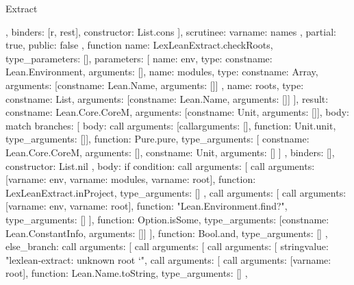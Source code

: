 \begin{lexlean}{Extract}
\begin{toolingmodule}
{{{{{{              }
            },
            binders: [r, rest],
            constructor: List.cons
          }
        ],
        scrutinee: var{name: names}
      },
      partial: true,
      public: false
    },
    function{
      name: LexLeanExtract.checkRoots,
      type_parameters: [],
      parameters: [
        {name: env, type: const{name: Lean.Environment, arguments: []}},
        {
          name: modules,
          type: const{name: Array, arguments: [const{name: Lean.Name, arguments: []}]}
        },
        {name: roots, type: const{name: List, arguments: [const{name: Lean.Name, arguments: []}]}}
      ],
      result: const{name: Lean.Core.CoreM, arguments: [const{name: Unit, arguments: []}]},
      body: match{
        branches: [
          {
            body: call{
              arguments: [call{arguments: [], function: Unit.unit, type_arguments: []}],
              function: Pure.pure,
              type_arguments: [
                const{name: Lean.Core.CoreM, arguments: []},
                const{name: Unit, arguments: []}
              ]
            },
            binders: [],
            constructor: List.nil
          },
          {
            body: if{
              condition: call{
                arguments: [
                  call{
                    arguments: [var{name: env}, var{name: modules}, var{name: root}],
                    function: LexLeanExtract.inProject,
                    type_arguments: []
                  },
                  call{
                    arguments: [
                      call{
                        arguments: [var{name: env}, var{name: root}],
                        function: "Lean.Environment.find?",
                        type_arguments: []
                      }
                    ],
                    function: Option.isSome,
                    type_arguments: [const{name: Lean.ConstantInfo, arguments: []}]
                  }
                ],
                function: Bool.and,
                type_arguments: []
              },
              else_branch: call{
                arguments: [
                  call{
                    arguments: [
                      call{
                        arguments: [
                          string{value: "lexlean-extract: unknown root `"},
                          call{
                            arguments: [
                              call{
                                arguments: [var{name: root}],
                                function: Lean.Name.toString,
                                type_arguments: []
                              },
}}}}}}}}}
\end{toolingmodule}
\end{lexlean}
